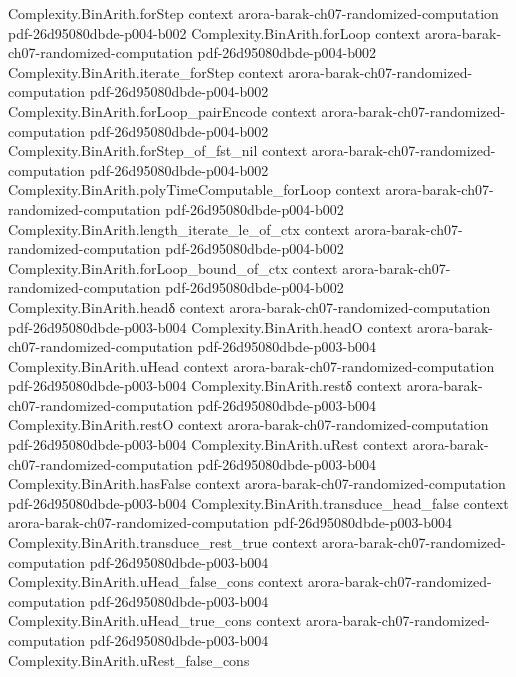 \begin{theorem}
\proofstep
  {Complexity.BinArith.forStep}
  {context}
  {arora-barak-ch07-randomized-computation}
  {pdf-26d95080dbde-p004-b002}
\proofstep
  {Complexity.BinArith.forLoop}
  {context}
  {arora-barak-ch07-randomized-computation}
  {pdf-26d95080dbde-p004-b002}
\proofstep
  {Complexity.BinArith.iterate_forStep}
  {context}
  {arora-barak-ch07-randomized-computation}
  {pdf-26d95080dbde-p004-b002}
\proofstep
  {Complexity.BinArith.forLoop_pairEncode}
  {context}
  {arora-barak-ch07-randomized-computation}
  {pdf-26d95080dbde-p004-b002}
\proofstep
  {Complexity.BinArith.forStep_of_fst_nil}
  {context}
  {arora-barak-ch07-randomized-computation}
  {pdf-26d95080dbde-p004-b002}
\proofstep
  {Complexity.BinArith.polyTimeComputable_forLoop}
  {context}
  {arora-barak-ch07-randomized-computation}
  {pdf-26d95080dbde-p004-b002}
\proofstep
  {Complexity.BinArith.length_iterate_le_of_ctx}
  {context}
  {arora-barak-ch07-randomized-computation}
  {pdf-26d95080dbde-p004-b002}
\proofstep
  {Complexity.BinArith.forLoop_bound_of_ctx}
  {context}
  {arora-barak-ch07-randomized-computation}
  {pdf-26d95080dbde-p004-b002}
\proofstep
  {Complexity.BinArith.headδ}
  {context}
  {arora-barak-ch07-randomized-computation}
  {pdf-26d95080dbde-p003-b004}
\proofstep
  {Complexity.BinArith.headO}
  {context}
  {arora-barak-ch07-randomized-computation}
  {pdf-26d95080dbde-p003-b004}
\proofstep
  {Complexity.BinArith.uHead}
  {context}
  {arora-barak-ch07-randomized-computation}
  {pdf-26d95080dbde-p003-b004}
\proofstep
  {Complexity.BinArith.restδ}
  {context}
  {arora-barak-ch07-randomized-computation}
  {pdf-26d95080dbde-p003-b004}
\proofstep
  {Complexity.BinArith.restO}
  {context}
  {arora-barak-ch07-randomized-computation}
  {pdf-26d95080dbde-p003-b004}
\proofstep
  {Complexity.BinArith.uRest}
  {context}
  {arora-barak-ch07-randomized-computation}
  {pdf-26d95080dbde-p003-b004}
\proofstep
  {Complexity.BinArith.hasFalse}
  {context}
  {arora-barak-ch07-randomized-computation}
  {pdf-26d95080dbde-p003-b004}
\proofstep
  {Complexity.BinArith.transduce_head_false}
  {context}
  {arora-barak-ch07-randomized-computation}
  {pdf-26d95080dbde-p003-b004}
\proofstep
  {Complexity.BinArith.transduce_rest_true}
  {context}
  {arora-barak-ch07-randomized-computation}
  {pdf-26d95080dbde-p003-b004}
\proofstep
  {Complexity.BinArith.uHead_false_cons}
  {context}
  {arora-barak-ch07-randomized-computation}
  {pdf-26d95080dbde-p003-b004}
\proofstep
  {Complexity.BinArith.uHead_true_cons}
  {context}
  {arora-barak-ch07-randomized-computation}
  {pdf-26d95080dbde-p003-b004}
\proofstep
  {Complexity.BinArith.uRest_false_cons}

\end{theorem}
